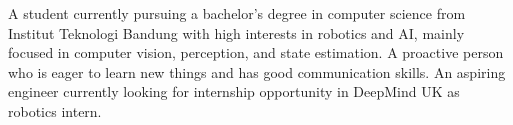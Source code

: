 

\begin{cvparagraph}
A student currently pursuing a bachelor's degree in computer science from Institut Teknologi Bandung with high interests in robotics and AI, mainly focused in computer vision, perception, and state estimation. A proactive person who is eager to learn new things and has good communication skills. An aspiring engineer currently looking for internship opportunity in DeepMind UK as robotics intern.
\end{cvparagraph}
